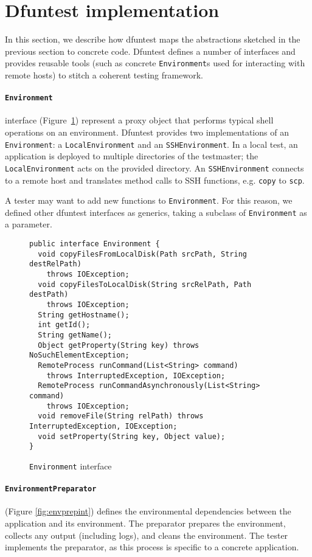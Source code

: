 \section{Dfuntest implementation}\label{sec:dfunt-impl}

In this section, we describe how dfuntest maps the abstractions sketched in the previous section to concrete code. Dfuntest defines a number of interfaces and provides reusable tools (such as concrete \texttt{Environment}s used for interacting with remote hosts) to stitch a coherent testing framework.

\paragraph{\texttt{Environment}} interface (Figure~\ref{fig:env_interface}) represent a proxy
object that performs typical shell operations on an environment.
Dfuntest provides two implementations of an \texttt{Environment}:
a \texttt{LocalEnvironment} and an \texttt{SSHEnvironment}.
In a local test, an application is deployed to multiple directories of the testmaster; the \texttt{LocalEnvironment} acts on the provided directory.
An \texttt{SSHEnvironment} connects to a remote host and translates method calls to SSH functions, e.g. \texttt{copy} to \texttt{scp}.

A tester may want to add new functions to \texttt{Environment}. For this reason, we defined other dfuntest interfaces as generics, taking a subclass of \texttt{Environment} as a parameter. 

\begin{figure}[tbp]
\begin{lstlisting}
public interface Environment {
  void copyFilesFromLocalDisk(Path srcPath, String destRelPath)
    throws IOException;
  void copyFilesToLocalDisk(String srcRelPath, Path destPath)
    throws IOException;
  String getHostname();
  int getId();
  String getName();
  Object getProperty(String key) throws NoSuchElementException;
  RemoteProcess runCommand(List<String> command)
    throws InterruptedException, IOException;
  RemoteProcess runCommandAsynchronously(List<String> command)
    throws IOException;
  void removeFile(String relPath) throws InterruptedException, IOException;
  void setProperty(String key, Object value);
}
\end{lstlisting}
\caption{\texttt{Environment} interface}
\label{fig:env_interface}
\end{figure}

\paragraph{\texttt{EnvironmentPreparator}} (Figure \ref{fig:envprepint}) defines the environmental dependencies between the application and its environment. The preparator prepares the environment, collects any output (including logs), and cleans the environment. The tester implements the preparator, as this process is specific to a concrete application.

